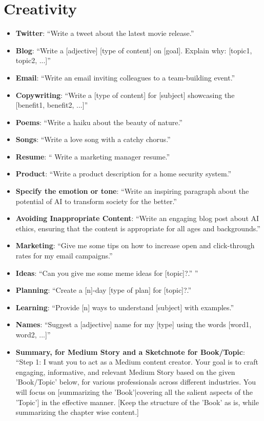 \section{Creativity}
\begin{itemize}
\itemsep-0.25em %
\item \textbf{Twitter}: ``Write a tweet about the latest movie release.''
\item \textbf{Blog}: ``Write a [adjective] [type of content] on [goal]. Explain
why: [topic1, topic2, ...]''
\item \textbf{Email}: ``Write an email inviting colleagues to a team-building event.''
\item \textbf{Copywriting}: ``Write a [type of content] for [subject] showcasing the [benefit1, benefit2, ...]''

\item \textbf{Poems}: ``Write a haiku about the beauty of nature.''
\item \textbf{Songs}: ``Write a love song with a catchy chorus.''
\item \textbf{Resume}: `` Write a marketing manager resume.''
\item \textbf{Product}: ``Write a product description for a home security system.''
\item \textbf{Specify the emotion or tone}: ``Write an inspiring paragraph about the potential of AI to transform society for the better.''
\item \textbf{Avoiding Inappropriate Content}: ``Write an engaging blog post about AI ethics, ensuring that the content is appropriate for all ages and backgrounds.''
\item \textbf{Marketing}: ``Give me some tips on how to increase open and click-through rates for my email campaigns.''
\item \textbf{Ideas}: ``Can you give me some meme ideas for [topic]?.''
''
\item \textbf{Planning}: ``Create a [n]-day [type of plan] for [topic]?.''
\item \textbf{Learning}: ``Provide [n] ways to understand [subject] with examples.''
\item \textbf{Names}: ``Suggest a [adjective] name for my [type] using the words [word1, word2, ...]''
\item \textbf{Summary, for Medium Story and a Sketchnote for Book/Topic}: ``Step 1: I want you to act as a Medium content creator. Your goal is to craft engaging, informative, and relevant Medium Story based on the given 'Book/Topic' below, for various professionals across different industries. You will focus on [summarizing the 'Book'|covering all the salient aspects of the 'Topic'] in the effective manner.  [Keep the structure of the 'Book' as is, while summarizing the chapter wise content.]


\end{itemize}
